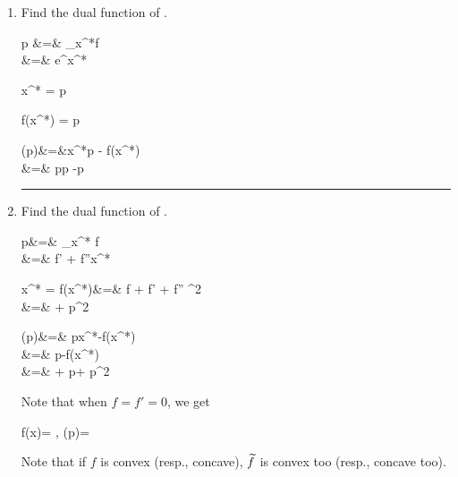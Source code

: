 \begin{enumerate}
\item
Find the dual function of
\beq
{}
\;.
\eeq

\beqa
p &=& \partial_{x^*}f
\\
&=&
e^{x^*}
\eeqa

\beq
x^* = \ln  p
\eeq

\beq
f(x^*) = p
\eeq

\beqa
{}(p)&=&x^*p - f(x^*)
\\
&=&
p\ln p -p
\eeqa



\hrule
\item
Find the dual function of
\beq
{}
\;.
\eeq

\beqa
p&=&
\partial_{x^*} f
\\
&=&
f' + f''x^*
\label{eq-p-xstar}
\eeqa

\beq
x^* = 
\eeq
\beqa
f(x^*)&=& f
+
f'
+
f''
^2
\\
&=&
+
p^2
\eeqa

\beqa
{}(p)&=&
px^*-f(x^*)
\\
&=&
p
-f(x^*)
\\
&=&
+
p
+
p^2
\eeqa

Note that when $f=f'=0$,
we get

\beq
f(x)=
,\quad
{}(p)= 
\eeq

Note that if $f$ is convex
(resp., concave), ${\widetilde{f}}$
is convex too (resp., concave too).

%
%
%
%


\end{enumerate}

